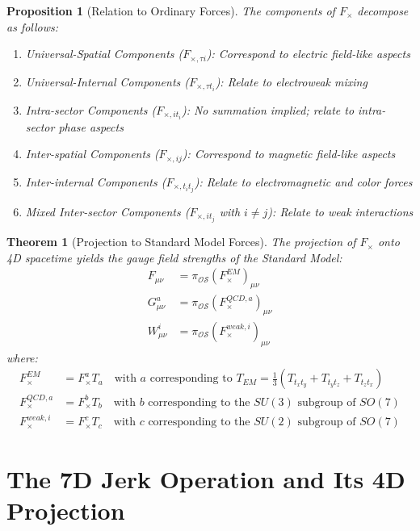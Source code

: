 \documentclass{article}
\newtheorem{theorem}{Theorem}
\newtheorem{proposition}{Proposition}
\begin{document}
\begin{proposition}[Relation to Ordinary Forces]
The components of $F_{\times}$ decompose as follows:
\begin{enumerate}
\item Universal-Spatial Components ($F_{\times,\tau i}$): Correspond to electric field-like aspects
\item Universal-Internal Components ($F_{\times,\tau t_i}$): Relate to electroweak mixing
\item Intra-sector Components ($F_{\times,i t_i}$): No summation implied; relate to intra-sector phase aspects
\item Inter-spatial Components ($F_{\times,ij}$): Correspond to magnetic field-like aspects
\item Inter-internal Components ($F_{\times,t_i t_j}$): Relate to electromagnetic and color forces
\item Mixed Inter-sector Components ($F_{\times,i t_j}$ with $i \neq j$): Relate to weak interactions
\end{enumerate}
\end{proposition}

\begin{theorem}[Projection to Standard Model Forces]
The projection of $F_{\times}$ onto 4D spacetime yields the gauge field strengths of the Standard Model:
\begin{align}
F_{\mu\nu} &= \pi_{\mathcal{OS}}(F^{EM}_{\times})_{\mu\nu} \\
G^a_{\mu\nu} &= \pi_{\mathcal{OS}}(F^{QCD,a}_{\times})_{\mu\nu} \\
W^i_{\mu\nu} &= \pi_{\mathcal{OS}}(F^{weak,i}_{\times})_{\mu\nu}
\end{align}
where:
\begin{align}
F^{EM}_{\times} &= F^a_{\times}T_a \quad \text{with } a \text{ corresponding to } T_{EM} = \frac{1}{3}(T_{t_x t_y} + T_{t_y t_z} + T_{t_z t_x}) \\
F^{QCD,a}_{\times} &= F^b_{\times}T_b \quad \text{with } b \text{ corresponding to the } SU(3) \text{ subgroup of } SO(7) \\
F^{weak,i}_{\times} &= F^c_{\times}T_c \quad \text{with } c \text{ corresponding to the } SU(2) \text{ subgroup of } SO(7)
\end{align}
\end{theorem}

\section{The 7D Jerk Operation and Its 4D Projection}
\end{document}
